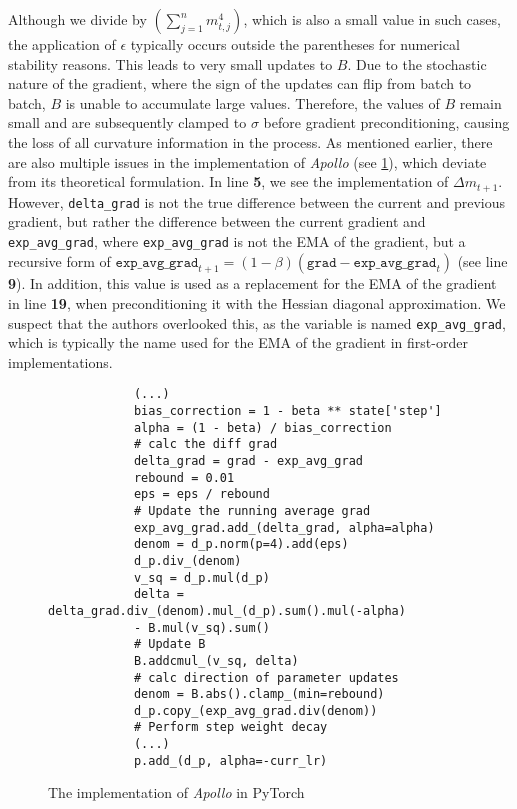 Although we divide by $\left(\sum_{j=1}^{n} m_{t,j}^{4} \right)$,
which is also a small value in such cases, the application of $\epsilon$ typically occurs outside the parentheses for numerical stability reasons.
This leads to very small updates to $B$. Due to the stochastic nature of the gradient, where the sign of the updates can flip from batch to batch,
$B$ is unable to accumulate large values. Therefore, the values of $B$ remain small and are subsequently clamped to $\sigma$ before gradient preconditioning,
causing the loss of all curvature information in the process.
As mentioned earlier, there are also multiple issues in the implementation of \emph{Apollo} (see \ref{fig:apollo_imp}),
which deviate from its theoretical formulation. In line \textbf{5}, we see the implementation of $\Delta m_{t+1}$.
However, \texttt{delta\_grad} is not the true difference between the current and previous gradient,
but rather the difference between the current gradient and \texttt{exp\_avg\_grad}, where \texttt{exp\_avg\_grad}
is not the EMA of the gradient, but a recursive form of $\texttt{exp\_avg\_grad}_{t+1} = (1-\beta) (\texttt{grad} - \texttt{exp\_avg\_grad}_{t})$ (see line \textbf{9}).
In addition, this value is used as a replacement for the EMA of the gradient in line \textbf{19}, when preconditioning it with the Hessian diagonal approximation.
We suspect that the authors overlooked this, as the variable is named \texttt{exp\_avg\_grad}, which is typically the name used for the EMA of the gradient in first-order implementations.
\begin{figure}[H]
    \begin{verbatim}
            (...)
            bias_correction = 1 - beta ** state['step']
            alpha = (1 - beta) / bias_correction
            # calc the diff grad
            delta_grad = grad - exp_avg_grad
            rebound = 0.01
            eps = eps / rebound
            # Update the running average grad
            exp_avg_grad.add_(delta_grad, alpha=alpha)
            denom = d_p.norm(p=4).add(eps)
            d_p.div_(denom)
            v_sq = d_p.mul(d_p)
            delta = delta_grad.div_(denom).mul_(d_p).sum().mul(-alpha) 
            - B.mul(v_sq).sum()
            # Update B
            B.addcmul_(v_sq, delta)
            # calc direction of parameter updates
            denom = B.abs().clamp_(min=rebound)
            d_p.copy_(exp_avg_grad.div(denom))
            # Perform step weight decay
            (...)
            p.add_(d_p, alpha=-curr_lr)
    \end{verbatim}
    \caption{The implementation of \emph{Apollo} in PyTorch}
    \label{fig:apollo_imp}

    \end{figure}
